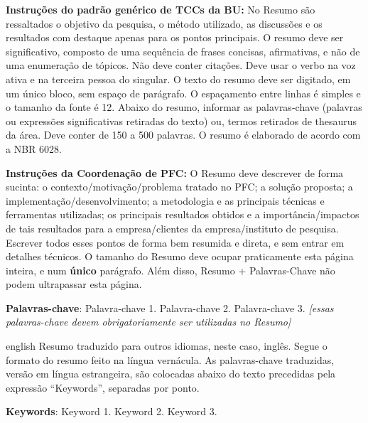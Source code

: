 \setlength{\absparsep}{18pt} %
\begin{resumo}
	\SingleSpacing
	\textbf{Instruções do padrão genérico de TCCs da BU:}
	No Resumo são ressaltados o objetivo da pesquisa, o método utilizado, as discussões e os resultados com destaque apenas para os pontos principais. O resumo deve ser significativo, composto de uma sequência de frases concisas, afirmativas, e não de uma enumeração de tópicos. Não deve conter citações. Deve usar o verbo na voz ativa e na terceira pessoa do singular. O texto do resumo deve ser digitado, em um único bloco, sem espaço de parágrafo. O espaçamento entre linhas é simples e o tamanho da fonte é 12. Abaixo do resumo, informar as palavras-chave (palavras ou expressões significativas retiradas do texto) ou, termos retirados de thesaurus da área. Deve conter de 150 a 500 palavras. O resumo é elaborado de acordo com a NBR 6028. 
	
	\textbf{Instruções da Coordenação de PFC:} O Resumo deve descrever de forma sucinta: o contexto/motivação/problema tratado no PFC; a solução proposta; a implementação/desenvolvimento; a metodologia e as principais técnicas e ferramentas utilizadas; os principais resultados obtidos e a importância/impactos de tais resultados para a empresa/clientes da empresa/instituto de pesquisa. Escrever todos esses pontos de forma bem resumida e direta, e sem entrar em detalhes técnicos. O tamanho do Resumo deve ocupar praticamente esta página inteira, e num \textbf{único} parágrafo. Além disso, Resumo + Palavras-Chave não podem ultrapassar esta página. 
		
	\textbf{Palavras-chave}: Palavra-chave 1. Palavra-chave 2. Palavra-chave 3. \emph{[essas palavras-chave devem obrigatoriamente ser utilizadas no Resumo]}
\end{resumo}

\begin{resumo}[Abstract]
	\SingleSpacing
	\begin{otherlanguage*}{english}
		Resumo traduzido para outros idiomas, neste caso, inglês. Segue o formato do resumo feito na língua vernácula. As palavras-chave traduzidas, versão em língua estrangeira, são colocadas abaixo do texto precedidas pela expressão “Keywords”, separadas por ponto.
		
		\textbf{Keywords}: Keyword 1. Keyword 2. Keyword 3.
	\end{otherlanguage*}
\end{resumo}

